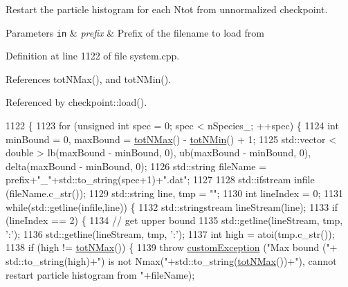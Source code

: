 Restart the particle histogram for each Ntot from unnormalized checkpoint. 


\begin{DoxyParams}[1]{Parameters}
\mbox{\tt in}  & {\em prefix} & Prefix of the filename to load from \\
\hline
\end{DoxyParams}


Definition at line 1122 of file system.\-cpp.



References tot\-N\-Max(), and tot\-N\-Min().



Referenced by checkpoint\-::load().


\begin{DoxyCode}
1122                                                           \{
1123     \textcolor{keywordflow}{for} (\textcolor{keywordtype}{unsigned} \textcolor{keywordtype}{int} spec = 0; spec < nSpecies\_; ++spec) \{
1124         \textcolor{keywordtype}{int} minBound = 0, maxBound = \hyperlink{classsim_system_aee2c65ecb43a35c0c4d070cdb45f7dc0}{totNMax}() - \hyperlink{classsim_system_af10842e0eaa638373b8717c87b47e6bc}{totNMin}() + 1;
1125         std::vector < double > lb(maxBound - minBound, 0), ub(maxBound - minBound, 0), delta(maxBound - 
      minBound, 0);
1126         std::string fileName = prefix+\textcolor{stringliteral}{"\_"}+std::to\_string(spec+1)+\textcolor{stringliteral}{".dat"};
1127 
1128         std::ifstream infile (fileName.c\_str());
1129         std::string line, tmp = \textcolor{stringliteral}{""};
1130         \textcolor{keywordtype}{int} lineIndex = 0;
1131         \textcolor{keywordflow}{while}(std::getline(infile,line)) \{
1132             std::stringstream lineStream(line);
1133             \textcolor{keywordflow}{if} (lineIndex == 2) \{
1134                 \textcolor{comment}{// get upper bound}
1135                 std::getline(lineStream, tmp, \textcolor{charliteral}{':'});
1136                 std::getline(lineStream, tmp, \textcolor{charliteral}{':'});
1137                 \textcolor{keywordtype}{int} high = atoi(tmp.c\_str());
1138                 \textcolor{keywordflow}{if} (high != \hyperlink{classsim_system_aee2c65ecb43a35c0c4d070cdb45f7dc0}{totNMax}()) \{
1139                     \textcolor{keywordflow}{throw} \hyperlink{classcustom_exception}{customException} (\textcolor{stringliteral}{"Max bound ("}+ std::to\_string(high)+\textcolor{stringliteral}{") is not
       Nmax("}+std::to\_string(\hyperlink{classsim_system_aee2c65ecb43a35c0c4d070cdb45f7dc0}{totNMax}())+\textcolor{stringliteral}{"), cannot restart particle histogram from "}+fileName);

\end{DoxyCode}
